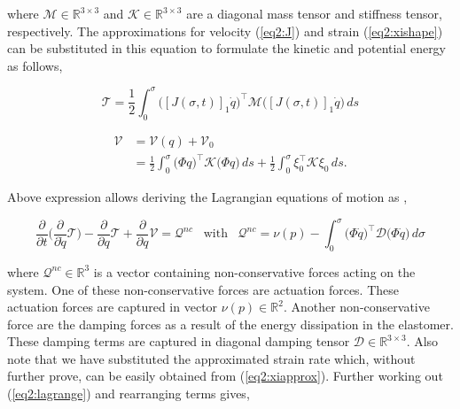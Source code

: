 where $\mathcal{M} \in \mathbb{R}^{3\times3}$ and $\mathcal{K} \in \mathbb{R}^{3\times3}$ are a diagonal mass tensor and stiffness tensor, respectively. The approximations for velocity (\ref{eq2:J}) and strain (\ref{eq2:xishape}) can be substituted in this equation to formulate the kinetic and potential energy as follows,

\begin{equation}
    \mathcal{T} = \frac{1}{2}\int_0^{\sigma} \Big([J(\sigma,t)]_1\dot{q}\Big)^\top \mathcal{M} \Big([J(\sigma,t)]_1\dot{q}\Big) \hspace{2pt} ds
\end{equation}

\begin{equation}
\begin{split}
    \mathcal{V} &= \mathcal{V}(q) + \mathcal{V}_0  \\
                &=  \frac{1}{2}\int_0^{\sigma} \big(\Phi q\big)^\top \mathcal{K} \big(\Phi q\big) \hspace{2pt} ds +\frac{1}{2} \int_0^\sigma \xi_0^\top \mathcal{K} \xi_0  \hspace{2pt} ds .
\end{split}
\end{equation}

Above expression allows deriving the Lagrangian equations of motion as \cite{NWouw},

\begin{equation}
    \frac{\partial}{\partial t}\Big( \frac{\partial}{\partial\dot{q}}\mathcal{T}\Big)- \frac{\partial}{\partial q}\mathcal{T} + \frac{\partial}{\partial q}\mathcal{V} = \mathcal{Q}^{nc} \hspace{10pt} \text{with} \hspace{10pt} \mathcal{Q}^{nc} =  \nu(p) - \int_0^\sigma \big(\Phi\dot{q}\big)^\top \mathcal{D} \big( \Phi \dot{q}\big) \hspace{2pt} d \sigma
    \label{eq2:lagrange}
\end{equation}

where $\mathcal{Q}^{nc} \in \mathbb{R}^3$ is a vector containing non-conservative forces acting on the system. One of these non-conservative forces are actuation forces. These actuation forces are captured in vector $\nu(p) \in \mathbb{R}^2$. Another non-conservative force are the damping forces as a result of the energy dissipation in the elastomer. These damping terms are captured in diagonal damping tensor $\mathcal{D} \in \mathbb{R}^{3 \times 3}$. Also note that we have substituted the approximated strain rate which, without further prove, can be easily obtained from (\ref{eq2:xiapprox}). Further working out (\ref{eq2:lagrange}) and rearranging terms gives,

